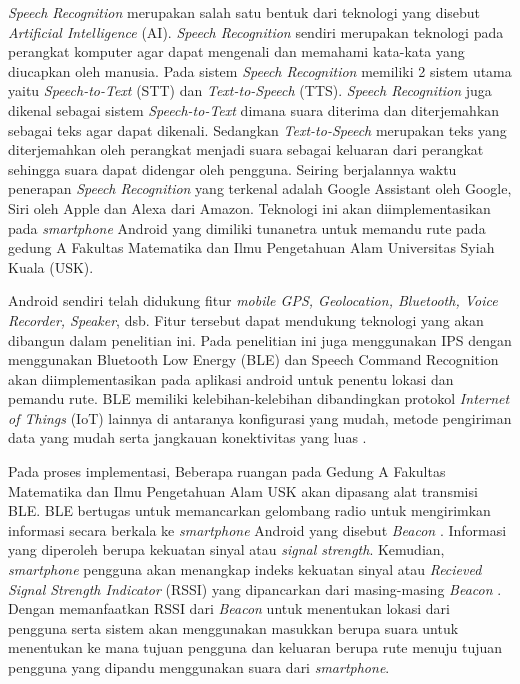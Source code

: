 \newpage

\par \textit{Speech Recognition} merupakan salah satu bentuk dari teknologi yang disebut \textit{Artificial Intelligence} (AI). \textit{Speech Recognition} sendiri merupakan teknologi pada perangkat komputer agar dapat mengenali dan memahami kata-kata yang diucapkan oleh manusia. Pada sistem \textit{Speech Recognition} memiliki 2 sistem utama yaitu \textit{Speech-to-Text} (STT) dan \textit{Text-to-Speech} (TTS). \textit{Speech Recognition} juga dikenal sebagai sistem \textit{Speech-to-Text} dimana suara diterima dan diterjemahkan sebagai teks agar dapat dikenali. 
Sedangkan \textit{Text-to-Speech} merupakan teks yang diterjemahkan oleh perangkat menjadi suara sebagai keluaran dari perangkat sehingga suara dapat didengar oleh pengguna. Seiring berjalannya waktu penerapan \textit{Speech Recognition} yang terkenal adalah Google Assistant oleh Google, Siri oleh Apple dan Alexa dari Amazon. Teknologi ini akan diimplementasikan pada \textit{smartphone} Android yang dimiliki tunanetra untuk memandu rute pada gedung A Fakultas Matematika dan Ilmu Pengetahuan Alam Universitas Syiah Kuala (USK).

\par Android sendiri telah didukung fitur \textit{mobile GPS, Geolocation, Bluetooth, Voice Recorder, Speaker}, dsb. Fitur tersebut dapat mendukung teknologi yang akan dibangun dalam
penelitian ini. Pada penelitian ini juga menggunakan IPS dengan menggunakan Bluetooth
Low Energy (BLE) dan Speech Command Recognition akan diimplementasikan pada aplikasi android untuk penentu lokasi dan pemandu rute. BLE memiliki kelebihan-kelebihan dibandingkan protokol \textit{Internet of Things} (IoT) lainnya di antaranya konfigurasi yang mudah, metode pengiriman data yang mudah serta jangkauan konektivitas yang luas \citep{puspitasari2020}. 

\par Pada proses implementasi, Beberapa ruangan pada Gedung A Fakultas Matematika dan Ilmu Pengetahuan Alam USK akan dipasang alat transmisi BLE. BLE bertugas untuk memancarkan gelombang radio untuk mengirimkan informasi secara berkala ke \textit{smartphone} Android yang disebut \textit{Beacon} \citep{lin2018interactive}. Informasi yang diperoleh berupa kekuatan sinyal atau \textit{signal strength}. Kemudian, \textit{smartphone} pengguna akan menangkap indeks kekuatan sinyal atau \textit{Recieved Signal Strength Indicator} (RSSI) yang dipancarkan dari masing-masing \textit{Beacon} \citep{li2018indoor}. Dengan memanfaatkan RSSI dari \textit{Beacon} untuk menentukan lokasi dari pengguna serta sistem akan menggunakan masukkan berupa suara untuk menentukan ke mana tujuan pengguna dan keluaran berupa rute menuju tujuan pengguna yang dipandu menggunakan suara dari \textit{smartphone}.

